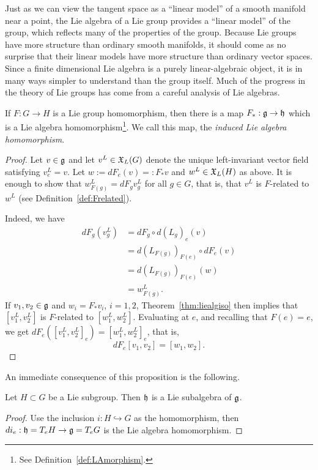 Just as we can view the tangent space as a ``linear model'' of a smooth manifold near a point, the Lie algebra of a Lie group provides a ``linear model'' of the group, which reflects many of the properties of the group.
Because Lie groups have more structure than ordinary smooth manifolds, it should come as no surprise that their linear models have more structure than ordinary vector spaces.
Since a finite dimensional Lie algebra is a purely linear-algebraic object, it is in many ways simpler to understand than the group itself.
Much of the progress in the theory of Lie groups has come from a careful analysis of Lie algebras.

\begin{proposition}
	If $F: G\to H$ is a Lie group homomorphism, then there is a map $F_*:\mathfrak{g}\to\mathfrak{h}$ which is a Lie algebra homomorphism\footnote{See Definition~\ref{def:LAmorphism}.}. We call this map, the \emph{induced Lie algebra homomorphism}.
\end{proposition}
\begin{proof}
	Let $v\in\mathfrak{g}$ and let $v^L\in\mathfrak{X}_L(G)$ denote the unique left-invariant vector field satisfying $v^L_e = v$.
	Let $w := dF_e(v) =: F_*v$ and $w^L\in\mathfrak{X}_L(H)$ as above.
	It is enough to show that $w^L_{F(g)} = dF_g v^L_g$ for all $g\in G$, that is, that $v^L$ is $F$-related to $w^L$ (see Definition~\ref{def:Frelated}).

	Indeed, we have
	\begin{align}
		dF_g(v^L_g) & = dF_g\circ d(L_g)_e(v)          \\
		            & =d(L_{F(g)})_{F(e)}\circ dF_e(v) \\
		            & =d(L_{F(g)})_{F(e)}(w)           \\
		            & =w^L_{F(g)}.
	\end{align}
	If $v_1,v_2 \in\mathfrak{g}$ and $w_i=F_*v_i$, $i=1,2$, Theorem~\ref{thm:liealgiso} then implies that $[v_1^L,v_2^L]$ is $F$-related to $[w_1^L,w_2^L]$.
	Evaluating at $e$, and recalling that $F(e)=e$, we get $dF_e([v_1^L,v_2^L]_e) = [w_1^L,w_2^L]_{e}$, that is,
	\begin{equation}
		dF_e[v_1,v_2] = [w_1, w_2].
	\end{equation}
\end{proof}

An immediate consequence of this proposition is the following.
\begin{corollary}
	Let $H\subset G$ be a Lie subgroup.
	Then $\mathfrak{h}$ is a Lie subalgebra of $\mathfrak{g}$.
\end{corollary}
\begin{proof}
	Use the inclusion $i:H\hookrightarrow G$ as the homomorphism, then $di_e:\mathfrak{h} = T_eH\to \mathfrak{g} = T_eG$ is the Lie algebra homomorphism.
\end{proof}

